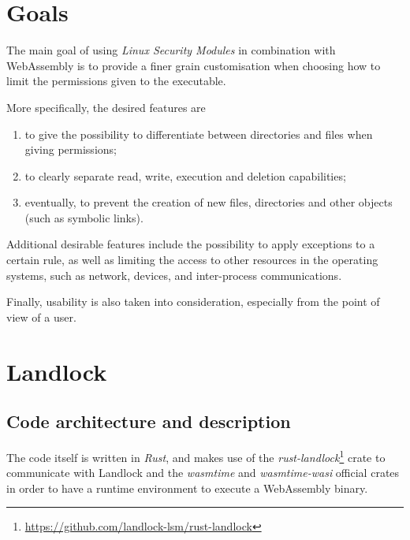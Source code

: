 \section{Goals}

The main goal of using \textit{Linux Security Modules} in combination with WebAssembly
is to provide a finer grain customisation when choosing how to limit the permissions given
to the executable.

More specifically, the desired features are
\begin{enumerate}
  \item to give the possibility to differentiate between directories and files when giving permissions;
  \item to clearly separate read, write, execution and deletion capabilities;
  \item eventually, to prevent the creation of new files, directories and other objects (such as symbolic links).
\end{enumerate}

Additional desirable features include the possibility to apply exceptions to a certain rule, as well
as limiting the access to other resources in the operating systems, such as network, devices, and
inter-process communications.

Finally, usability is also taken into consideration, especially from the point of view of a user.

\newpage
\section{Landlock}

\subsection{Code architecture and description}\label{sec:landlock-code-architecture}

The code itself is written in \textit{Rust}, and makes use of the
\textit{rust-landlock}\footnote{\url{https://github.com/landlock-lsm/rust-landlock}} crate
to communicate with Landlock and the \textit{wasmtime} and \textit{wasmtime-wasi} official
crates in order to have a runtime environment to execute a WebAssembly binary.

